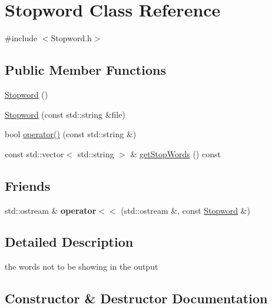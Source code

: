 \hypertarget{classStopword}{}\section{Stopword Class Reference}
\label{classStopword}


{\ttfamily \#include $<$Stopword.\+h$>$}

\subsection*{Public Member Functions}
\begin{DoxyCompactItemize}
\item 
\hyperlink{classStopword_a9580930ded0ee601ad610a078914a628}{Stopword} ()
\item 
\hyperlink{classStopword_a7905aacd5d59b997b50506a71d12a0f7}{Stopword} (const std\+::string \&file)
\item 
bool \hyperlink{classStopword_a2acde54983583632735c84fdb0c12d7e}{operator()} (const std\+::string \&)
\item 
const std\+::vector$<$ std\+::string $>$ \& \hyperlink{classStopword_adf2fd764697815c3caa65b6ace21eed1}{get\+Stop\+Words} () const
\end{DoxyCompactItemize}
\subsection*{Friends}
\begin{DoxyCompactItemize}
\item 
\mbox{\label{classStopword_a33de0e6203154212a6d2f798efd40d67}} 
std\+::ostream \& {\bfseries operator$<$$<$} (std\+::ostream \&, const \hyperlink{classStopword}{Stopword} \&)
\end{DoxyCompactItemize}


\subsection{Detailed Description}
the words not to be showing in the output 

\subsection{Constructor \& Destructor Documentation}
\mbox{\label{classStopword_a9580930ded0ee601ad610a078914a628}} 
